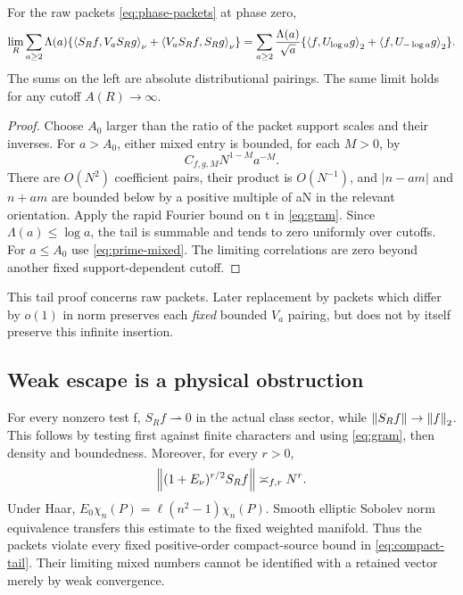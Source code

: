 \begin{proposition}\label{prop:prime-tail}
For the raw packets \eqref{eq:phase-packets} at phase zero,
\begin{equation}\label{eq:infinite-prime-limit}
\lim_R\sum_{a\ge2}\Lambda(a)
\{\left\langle S_Rf,V_aS_Rg\right\rangle_\nu+
  \left\langle V_aS_Rf,S_Rg\right\rangle_\nu\}
=\sum_{a\ge2}\frac{\Lambda(a)}{\sqrt a}
 \{\left\langle f,U_{\log a}g\right\rangle_2+\left\langle f,U_{-\log a}g\right\rangle_2\}.
\end{equation}
The sums on the left are absolute distributional pairings.
The same limit holds for any cutoff $A(R)\to\infty$.
\end{proposition}
\begin{proof}
Choose $A_0$ larger than the ratio of the packet support scales
and their inverses. For $a>A_0$, either mixed entry is bounded,
for each $M>0$, by
\begin{equation}
C_{f,g,M}N^{1-M}a^{-M}.
\end{equation}
There are $O(N^2)$ coefficient pairs, their product is $O(N^{-1})$,
and $|n-am|$ and $n+am$ are bounded below by a positive multiple of
aN in the relevant orientation. Apply the rapid Fourier bound
on t in \eqref{eq:gram}. Since $\Lambda(a)\le\log a$, the tail
is summable and tends to zero uniformly over cutoffs.
For $a\le A_0$ use \eqref{eq:prime-mixed}. The limiting correlations
are zero beyond another fixed support-dependent cutoff.
\end{proof}
This tail proof concerns raw packets. Later replacement by packets
which differ by $o(1)$ in norm preserves each \emph{fixed} bounded
$V_a$ pairing, but does not by itself preserve this infinite insertion.

\subsection{Weak escape is a physical obstruction}
For every nonzero test f, $S_Rf\rightharpoonup0$ in the actual
class sector, while $\left\lVert S_Rf\right\rVert\to\left\lVert f\right\rVert_2$. This follows by
testing first against finite characters and using
\eqref{eq:gram}, then density and boundedness.
Moreover, for every $r>0$,
\begin{equation}\label{eq:packet-escape}
\left\lVert(1+E_\nu)^{r/2}S_Rf\right\rVert\asymp_{f,r}N^r .
\end{equation}
Under Haar, $E_0\chi_n(P)=\ell(n^2-1)\chi_n(P)$.
Smooth elliptic Sobolev norm equivalence transfers this estimate
to the fixed weighted manifold. Thus the packets violate every
fixed positive-order compact-source bound in
\eqref{eq:compact-tail}. Their limiting mixed numbers cannot
be identified with a retained vector merely by weak convergence.
